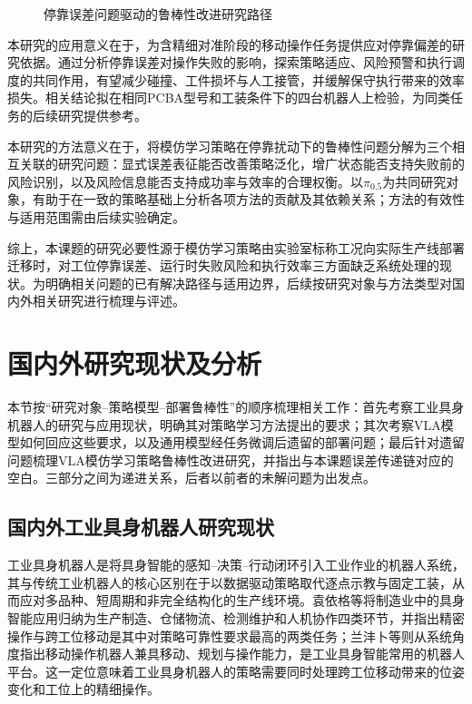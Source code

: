 \begin{figure}[htbp]
  \centering
  
  \caption{停靠误差问题驱动的鲁棒性改进研究路径}
  \label{fig:research-entry-route}
\end{figure}

本研究的应用意义在于，为含精细对准阶段的移动操作任务提供应对停靠偏差的研究依据。通过分析停靠误差对操作失败的影响，探索策略适应、风险预警和执行调度的共同作用，有望减少碰撞、工件损坏与人工接管，并缓解保守执行带来的效率损失。相关结论拟在相同PCBA型号和工装条件下的四台机器人上检验，为同类任务的后续研究提供参考。

本研究的方法意义在于，将模仿学习策略在停靠扰动下的鲁棒性问题分解为三个相互关联的研究问题：显式误差表征能否改善策略泛化，增广状态能否支持失败前的风险识别，以及风险信息能否支持成功率与效率的合理权衡。以\(\pi_{0.5}\)为共同研究对象，有助于在一致的策略基础上分析各项方法的贡献及其依赖关系；方法的有效性与适用范围需由后续实验确定。

综上，本课题的研究必要性源于模仿学习策略由实验室标称工况向实际生产线部署迁移时，对工位停靠误差、运行时失败风险和执行效率三方面缺乏系统处理的现状。为明确相关问题的已有解决路径与适用边界，后续按研究对象与方法类型对国内外相关研究进行梳理与评述。

\section{国内外研究现状及分析}

本节按“研究对象--策略模型--部署鲁棒性”的顺序梳理相关工作：首先考察工业具身机器人的研究与应用现状，明确其对策略学习方法提出的要求；其次考察VLA模型如何回应这些要求，以及通用模型经任务微调后遗留的部署问题；最后针对遗留问题梳理VLA模仿学习策略鲁棒性改进研究，并指出与本课题误差传递链对应的空白。三部分之间为递进关系，后者以前者的未解问题为出发点。

\subsection{国内外工业具身机器人研究现状}

工业具身机器人是将具身智能的感知--决策--行动闭环引入工业作业的机器人系统，其与传统工业机器人的核心区别在于以数据驱动策略取代逐点示教与固定工装，从而应对多品种、短周期和非完全结构化的生产线环境\cite{zhang2026eiir,ren2025embodiedsmartmanufacturing}。袁依格等将制造业中的具身智能应用归纳为生产制造、仓储物流、检测维护和人机协作四类环节，并指出精密操作与跨工位移动是其中对策略可靠性要求最高的两类任务\cite{yuan2025embodiedmanufacturing}；兰沣卜等则从系统角度指出移动操作机器人兼具移动、规划与操作能力，是工业具身智能常用的机器人平台\cite{lan2024mobilemanipulator}。这一定位意味着工业具身机器人的策略需要同时处理跨工位移动带来的位姿变化和工位上的精细操作。

